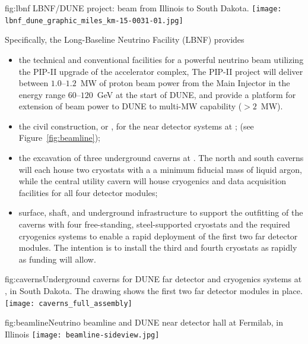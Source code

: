 \begin{dunefigure}{fig:lbnf}{ 	
LBNF/DUNE project: beam from Illinois to South Dakota.}
\texttt{[image: lbnf\_dune\_graphic\_miles\_km-15-0031-01.jpg]}
\end{dunefigure}

Specifically, the Long-Baseline Neutrino Facility (LBNF) provides
\begin{itemize}
\item  the  technical and conventional facilities for a powerful neutrino beam utilizing the PIP-II upgrade of the \fnal accelerator 
complex, The PIP-II project will deliver between $1.0$--$1.2$~MW of proton beam power from the Main Injector in the energy range $60$--$120$~GeV at the start of DUNE, and provide a platform for extension of beam power to DUNE to multi-MW capability ($>2$~MW). 

\item  the civil construction, or , for the near detector systems at \fnal; (see Figure~\ref{fig:beamline});

\item the excavation of three underground caverns at \surf. The north and south caverns will each house two cryostats with a
a minimum \nominalmodsize fiducial mass of liquid argon, while the central utility cavern will house cryogenics and data acquisition facilities for all four detector modules;

\item surface, shaft, and underground infrastructure to support 
the outfitting of the caverns with four free-standing, steel-supported cryostats 
and the required cryogenics systems to enable a rapid deployment of the first two \nominalmodsize far detector modules. 
The intention is to install the third and fourth cryostats as rapidly as funding will 
allow.
\end{itemize}

\begin{dunefigure}{fig:caverns}{Underground caverns for DUNE far detector and cryogenics systems at , in South Dakota. The drawing shows the first two far detector modules in place.}
\texttt{[image: caverns\_full\_assembly]}
\end{dunefigure}

\begin{dunefigure}{fig:beamline}{Neutrino beamline and DUNE near detector hall at Fermilab, in Illinois}
\texttt{[image: beamline-sideview.jpg]}
\end{dunefigure}



